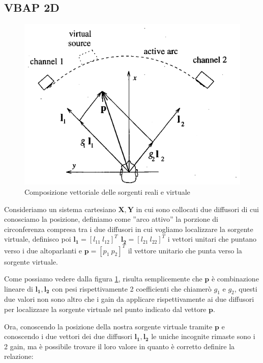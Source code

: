 \documentclass[12pt,a4paper]{report}
\begin{document}
\subsection{VBAP 2D}\label{c}

\begin{figure}[htbp]
	\centering
	\includegraphics[scale=0.48]{figures/matrix2d.png}
	\caption {Composizione vettoriale delle sorgenti reali e virtuale}
	\label{fig:vettori2d}
	\end{figure}

Consideriamo un sistema cartesiano $ \boldsymbol{X},\boldsymbol{Y}$ in cui sono collocati due diffusori di cui conosciamo la posizione, definiamo come ''arco attivo'' la porzione di circonferenza compresa tra i due diffusori in cui vogliamo localizzare la sorgente virtuale, definisco poi $\boldsymbol{l_{1}}= {\left[ l_{11} \ l_{12} \right]}^T \ \  \boldsymbol{l_{2}}= {\left[ l_{21} \ l_{22} \right]}^T$ i vettori unitari che puntano verso i due altoparlanti e $\boldsymbol{p}= {\left[ p_1 \ p_2 \right]}^T$ il vettore unitario che punta verso la sorgente virtuale.

Come possiamo vedere dalla figura \ref{fig:vettori2d}, risulta semplicemente che $\boldsymbol{p}$ è combinazione lineare di $\boldsymbol{l_{1}}, \boldsymbol{l_{2}}$ con pesi rispettivamente 2 coefficienti che chiamerò $g_1$ e $g_2$, questi due valori non sono altro che i gain da applicare rispettivamente ai due diffusori per localizzare la sorgente virtuale nel punto indicato dal vettore $\boldsymbol{p}$.

Ora, conoscendo la posizione della nostra sorgente virtuale tramite $\boldsymbol{p}$ e conoscendo i due vettori dei due diffusori $\boldsymbol{l_{1}}, \boldsymbol{l_{2}}$ le uniche incognite rimaste sono i 2 gain, ma è possibile trovare il loro valore in quanto è corretto definire la relazione: %
\end{document}
